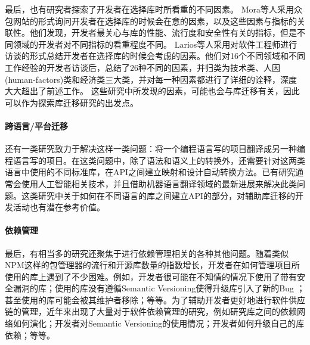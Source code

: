 \documentclass[UTF8]{ctexart}
\begin{document}
最后，也有研究者探索了开发者在选择库时所看重的不同因素\cite{2018ICSE-Mora-Which, 2018PROMISE-Mora-An, 2020FSE-Larios-Selecting}。
Mora等人\cite{2018ICSE-Mora-Which, 2018PROMISE-Mora-An}采用众包网站的形式询问开发者在选择库的时候会在意的因素，以及这些因素与指标的关联性。他们发现，开发者最关心与库的性能、流行度和安全性有关的指标，但是不同领域的开发者对不同指标的看重程度不同。
Larios等人\cite{2020FSE-Larios-Selecting}采用对软件工程师进行访谈的形式总结开发者在选择库的时候会考虑的因素。他们对16个不同领域和不同工作经验的开发者访谈后，总结了26种不同的因素，并归类为技术类、人因(human-factors)类和经济类三大类，并对每一种因素都进行了详细的诠释，深度大大超出了前述工作。
这些研究中所发现的因素，可能也会与库迁移有关，因此可以作为探索库迁移研究的出发点。

\paragraph{跨语言/平台迁移}
还有一类研究致力于解决这样一类问题：将一个编程语言写的项目翻译成另一种编程语言写的项目\cite{2013FSE-Nguyen-Lexical, 2014ASE-Nguyen-Statistical, 2015ASE-Nguyen-DivideAndConquer,2016ICSE-Nguyen-Mapping,2016ICSM-Nguyen-Context,2017ICJAI-Gu-DeepAM,2017ICSE-Phan-Statistical}。在这类问题中，除了语法和语义上的转换外，还需要针对这两类语言中使用的不同标准库，在API之间建立映射和设计自动转换方法。已有研究通常会使用人工智能相关技术，并且借助机器语言翻译领域的最新进展来解决此类问题。这类研究中关于如何在不同语言的库之间建立API的部分，对辅助库迁移的开发活动也有潜在参考价值。

\paragraph{依赖管理}
最后，有相当多的研究还聚焦于进行依赖管理相关的各种其他问题。随着类似NPM这样的包管理器的流行和开源库数量的指数增长，开发者在如何管理项目所使用的库上遇到了不少困难。例如，开发者很可能在不知情的情况下使用了带有安全漏洞的库\cite{2018ICSME-Zapata-Towards}；使用的库没有遵循Semantic Versioning使得升级库引入了新的Bug \cite{2019TSE-Decan-Semantic}；甚至使用的库可能会被其维护者移除\cite{2017MSR-Kikas-Structure}；等等。为了辅助开发者更好地进行软件供应链的管理，近年来出现了大量对于软件依赖管理的研究，例如研究库之间的依赖网络如何演化\cite{2017MSR-Kikas-Structure}；开发者对Semantic Versioning的使用情况\cite{2019MSR-Dietrich-DependencyVersioning,2019TSE-Decan-Semantic}；开发者如何升级自己的库依赖\cite{2018ICSME-Zapata-Towards,2018EMSE-Kula-Do}；等等。

\end{document}
